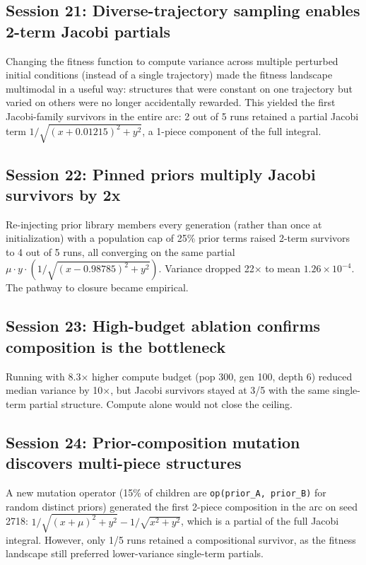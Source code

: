 \subsection{Session 21: Diverse-trajectory sampling enables 2-term Jacobi partials}

Changing the fitness function to compute variance across multiple perturbed initial conditions (instead of a single trajectory) made the fitness landscape multimodal in a useful way: structures that were constant on one trajectory but varied on others were no longer accidentally rewarded. This yielded the first Jacobi-family survivors in the entire arc: 2 out of 5 runs retained a partial Jacobi term $1/\sqrt{(x+0.01215)^2 + y^2}$, a 1-piece component of the full integral.

\subsection{Session 22: Pinned priors multiply Jacobi survivors by 2x}

Re-injecting prior library members every generation (rather than once at initialization) with a population cap of 25\% prior terms raised 2-term survivors to 4 out of 5 runs, all converging on the same partial $\mu \cdot y \cdot (1/\sqrt{(x-0.98785)^2+y^2})$. Variance dropped 22× to mean $1.26 \times 10^{-4}$. The pathway to closure became empirical.

\subsection{Session 23: High-budget ablation confirms composition is the bottleneck}

Running with 8.3× higher compute budget (pop 300, gen 100, depth 6) reduced median variance by 10×, but Jacobi survivors stayed at 3/5 with the same single-term partial structure. Compute alone would not close the ceiling.

\subsection{Session 24: Prior-composition mutation discovers multi-piece structures}

A new mutation operator (15\% of children are \texttt{op(prior\_A, prior\_B)} for random distinct priors) generated the first 2-piece composition in the arc on seed 2718: $1/\sqrt{(x+\mu)^2+y^2} - 1/\sqrt{x^2+y^2}$, which is a partial of the full Jacobi integral. However, only 1/5 runs retained a compositional survivor, as the fitness landscape still preferred lower-variance single-term partials.

